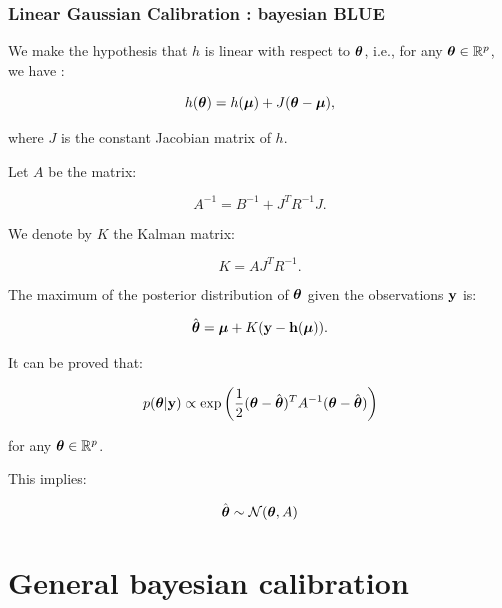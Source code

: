\documentclass{beamer}
\begin{document}
\begin{frame}
\frametitle{Linear Gaussian Calibration : bayesian BLUE}
We make the hypothesis that $h$ is linear with respect to
$\boldsymbol{\theta}$, i.e., for any
$\boldsymbol{\theta}\in\mathbb{R}^p$, we have :

$$
h(\boldsymbol{\theta}) = h(\boldsymbol{\mu}) + J(\boldsymbol{\theta}-\boldsymbol{\mu} ),
$$

where $J$ is the constant Jacobian matrix of $h$.

Let $A$ be the matrix:

$$
A^{-1} = B^{-1} + J^T R^{-1} J.
$$

We denote by $K$ the Kalman matrix:

$$
K = A J^T R^{-1}.
$$

The maximum of the posterior distribution of $\boldsymbol{\theta}$ given
the observations ${\bf y}$ is:

$$
\hat{\boldsymbol{\theta}} = \boldsymbol{\mu} + K ({\bf y} - {\bf h}(\boldsymbol{\mu})).
$$

\end{frame}

\begin{frame}
It can be proved that:

$$
   p(\boldsymbol{\theta} | {\bf y}) \propto 
   \exp\left(\frac{1}{2} (\boldsymbol{\theta} - \hat{\boldsymbol{\theta}})^T A^{-1} (\boldsymbol{\theta} - \hat{\boldsymbol{\theta}}) \right)
$$

for any $\boldsymbol{\theta}\in\mathbb{R}^p$.

This implies:

$$
\hat{\boldsymbol{\theta}} \sim \mathcal{N}(\boldsymbol{\theta},A)
$$
\end{frame}

\section{General bayesian calibration}

\end{document}
